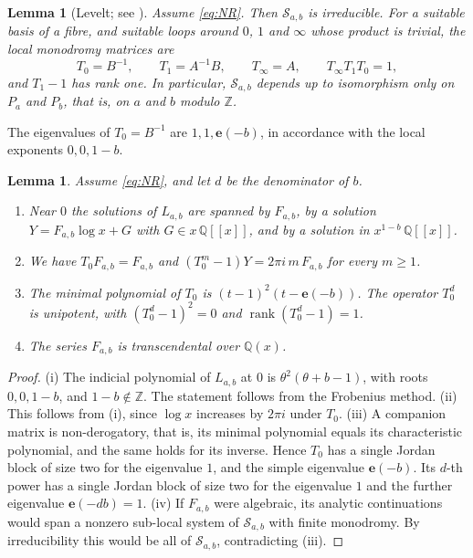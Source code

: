 \documentclass[11pt]{amsart}
\newtheorem{lemma}[theorem]{Lemma}
\theoremstyle{definition}
\theoremstyle{remark}
\numberwithin{equation}{section}
\newcommand{\Q}{\mathbb{Q}}
\newcommand{\Z}{\mathbb{Z}}
\newcommand{\e}{\mathbf{e}}
\newcommand{\cS}{\mathcal{S}}
\DeclareMathOperator{\rank}{rank}
\newcommand{\Fab}{F_{a,b}}
\newcommand{\Sab}{\cS_{a,b}}
\begin{document}
\begin{lemma}[{Levelt; see \citet[Proposition~3.3 and Theorem~3.5]{BeukersHeckman1989}}]\label{lem:levelt}
Assume \eqref{eq:NR}. Then $\Sab$ is irreducible. For a suitable basis of a fibre, and suitable loops around $0$, $1$ and $\infty$ whose product is trivial, the local monodromy matrices are
\[
T_0=B^{-1},\qquad T_1=A^{-1}B,\qquad T_\infty=A,\qquad T_\infty T_1T_0=1 ,
\]
and $T_1-1$ has rank one. In particular, $\Sab$ depends up to isomorphism only on $P_a$ and $P_b$, that is, on $a$ and $b$ modulo $\Z$.
\end{lemma}

The eigenvalues of $T_0=B^{-1}$ are $1,1,\e(-b)$, in accordance with the local exponents $0,0,1-b$.

\begin{lemma}\label{lem:local0}
Assume \eqref{eq:NR}, and let $d$ be the denominator of $b$.
\begin{enumerate}[label=\textup{(\roman*)},leftmargin=2em]
\item Near $0$ the solutions of $L_{a,b}$ are spanned by $\Fab$, by a solution $Y=\Fab\log x+G$ with $G\in x\,\Q[[x]]$, and by a solution in $x^{1-b}\,\Q[[x]]$.
\item We have $T_0\Fab=\Fab$ and $(T_0^m-1)Y=2\pi i\,m\,\Fab$ for every $m\ge1$.
\item The minimal polynomial of $T_0$ is $(t-1)^2(t-\e(-b))$. The operator $T_0^d$ is unipotent, with $(T_0^d-1)^2=0$ and $\rank(T_0^d-1)=1$.
\item The series $\Fab$ is transcendental over $\Q(x)$.
\end{enumerate}
\end{lemma}

\begin{proof}
(i) The indicial polynomial of $L_{a,b}$ at $0$ is $\theta^2(\theta+b-1)$, with roots $0,0,1-b$, and $1-b\notin\Z$. The statement follows from the Frobenius method. (ii) This follows from (i), since $\log x$ increases by $2\pi i$ under $T_0$. (iii) A companion matrix is non-derogatory, that is, its minimal polynomial equals its characteristic polynomial, and the same holds for its inverse. Hence $T_0$ has a single Jordan block of size two for the eigenvalue $1$, and the simple eigenvalue $\e(-b)$. Its $d$-th power has a single Jordan block of size two for the eigenvalue $1$ and the further eigenvalue $\e(-db)=1$. (iv) If $\Fab$ were algebraic, its analytic continuations would span a nonzero sub-local system of $\Sab$ with finite monodromy. By irreducibility this would be all of $\Sab$, contradicting (iii).
\end{proof}
\end{document}
